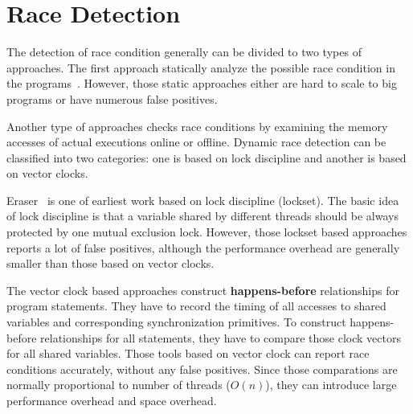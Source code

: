 \section{Race Detection}
The detection of race condition generally can be divided to two types of approaches.
The first approach statically analyze the possible race condition in 
the programs~\cite{race:static1, race:static2, race:static3, race:static4, race:static5}.
However, those static approaches either are hard to scale to big programs 
or have numerous false positives. 

Another type of approaches checks race conditions by examining 
the memory accesses of actual executions online or offline. 
Dynamic race detection can be classified into two categories: 
one is based on lock discipline  and another is based on vector clocks.

Eraser~\cite{race:eraser} is one of earliest work based on lock discipline (lockset).
The basic idea of lock discipline is that 
a variable shared by different threads should be always protected by one 
mutual exclusion lock. However, those lockset based approaches reports 
a lot of false positives, although the performance overhead are generally smaller 
than those based on vector clocks. 

The vector clock based approaches construct \textbf{happens-before} relationships for program
statements. They have to record the timing of all accesses to shared variables 
and corresponding synchronization primitives.
To construct happens-before relationships for all statements, 
they have to compare those clock vectors for all shared variables. 
Those tools based on vector clock can report race conditions accurately, without any false positives.
Since those comparations are normally proportional to number of threads ($O(n)$), they
can introduce large performance overhead and space overhead.
 
